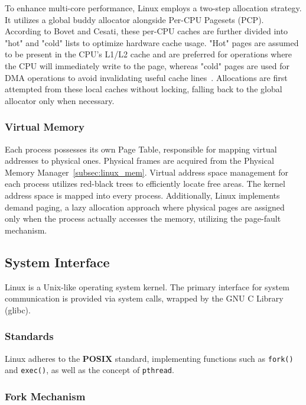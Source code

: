\documentclass[a4paper,10pt,twoside]{report}
\theoremstyle{definition}
\begin{document}
To enhance multi-core performance, Linux employs a two-step allocation strategy. It utilizes a global buddy allocator alongside Per-CPU Pagesets (PCP). According to Bovet and Cesati, these per-CPU caches are further divided into "hot" and "cold" lists to optimize hardware cache usage. "Hot" pages are assumed to be present in the CPU's L1/L2 cache and are preferred for operations where the CPU will immediately write to the page, whereas "cold" pages are used for DMA operations to avoid invalidating useful cache lines~\cite{bovet2005understanding}. Allocations are first attempted from these local caches without locking, falling back to the global allocator only when necessary.

\subsubsection{Virtual Memory}

Each process possesses its own Page Table, responsible for mapping virtual addresses to physical ones. Physical frames are acquired from the Physical Memory Manager~\ref{subsec:linux_mem}. Virtual address space management for each process utilizes red-black trees to efficiently locate free areas. The kernel address space is mapped into every process. Additionally, Linux implements demand paging, a lazy allocation approach where physical pages are assigned only when the process actually accesses the memory, utilizing the page-fault mechanism.

\subsection{System Interface}

Linux is a Unix-like operating system kernel. The primary interface for system communication is provided via system calls, wrapped by the GNU C Library (glibc).

\subsubsection{Standards}

Linux adheres to the \textbf{POSIX} standard, implementing functions such as \texttt{fork()} and \texttt{exec()}, as well as the concept of \texttt{pthread}.

\subsubsection{Fork Mechanism}
\end{document}
